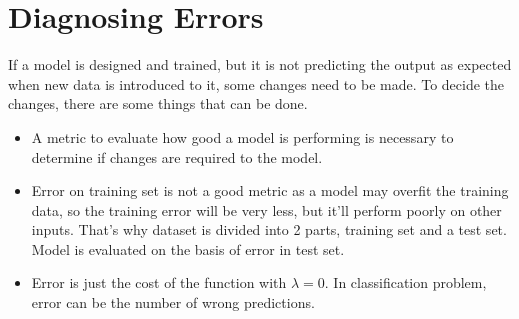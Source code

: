 \documentclass{article}
\begin{document}
\section{Diagnosing Errors}
If a model is designed and trained, but it is not predicting the output as expected when new data is introduced to it, some changes need to be made. To decide the changes, there are some things that can be done.
\begin{itemize}
	\item A metric to evaluate how good a model is performing is necessary to determine if changes are required to the model.
	\item Error on training set is not a good metric as a model may overfit the training data, so the training error will be very less, but it'll perform poorly on other inputs. That's why dataset is divided into 2 parts, training set and a test set. Model is evaluated on the basis of error in test set.
	\item Error is just the cost of the function with $\lambda=0$. In classification problem, error can be the number of wrong predictions.
\end{itemize}
\end{document}
